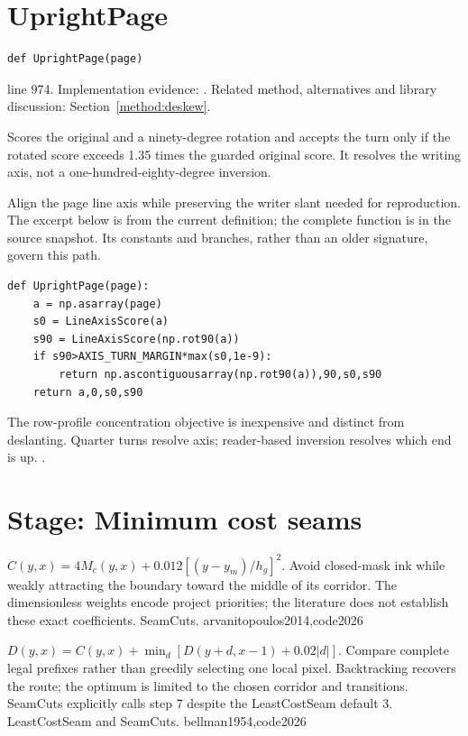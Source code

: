 \section{UprightPage}\label{fn:segment:UprightPage}
\begin{lstlisting}[style=sig]
def UprightPage(page)
\end{lstlisting}
 line 974. Implementation evidence: \cite{code2026}. Related method, alternatives and library discussion: Section~\ref{method:deskew}.


Scores the original and a ninety-degree rotation and accepts the turn only if the rotated score exceeds 1.35 times the guarded original score. It resolves the writing axis, not a one-hundred-eighty-degree inversion.


Align the page line axis while preserving the writer slant needed for reproduction. The excerpt below is from the current definition; the complete function is in the source snapshot. Its constants and branches, rather than an older signature, govern this path.


\begin{lstlisting}[style=plain]
def UprightPage(page):
    a = np.asarray(page)
    s0 = LineAxisScore(a)
    s90 = LineAxisScore(np.rot90(a))
    if s90>AXIS_TURN_MARGIN*max(s0,1e-9):
        return np.ascontiguousarray(np.rot90(a)),90,s0,s90
    return a,0,s0,s90
\end{lstlisting}
The row-profile concentration objective is inexpensive and distinct from deslanting. Quarter turns resolve axis; reader-based inversion resolves which end is up. \cite{postl1986,wolberg1990,opencvtransform,pillowops}.


\section*{Stage: Minimum cost seams}
{$C(y,x)=4M_c(y,x)+0.012[(y-y_m)/h_g]^2$.}
{Avoid closed-mask ink while weakly attracting the boundary toward the middle
of its corridor. The dimensionless weights encode project priorities; the
literature does not establish these exact coefficients.}
{SeamCuts.}
{arvanitopoulos2014,code2026}

{$D(y,x)=C(y,x)+\min_d[D(y+d,x-1)+0.02|d|]$.}
{Compare complete legal prefixes rather than greedily selecting one local
pixel. Backtracking recovers the route; the optimum is limited to the chosen
corridor and transitions. SeamCuts explicitly calls step 7 despite the
LeastCostSeam default 3.}
{LeastCostSeam and SeamCuts.}
{bellman1954,code2026}


